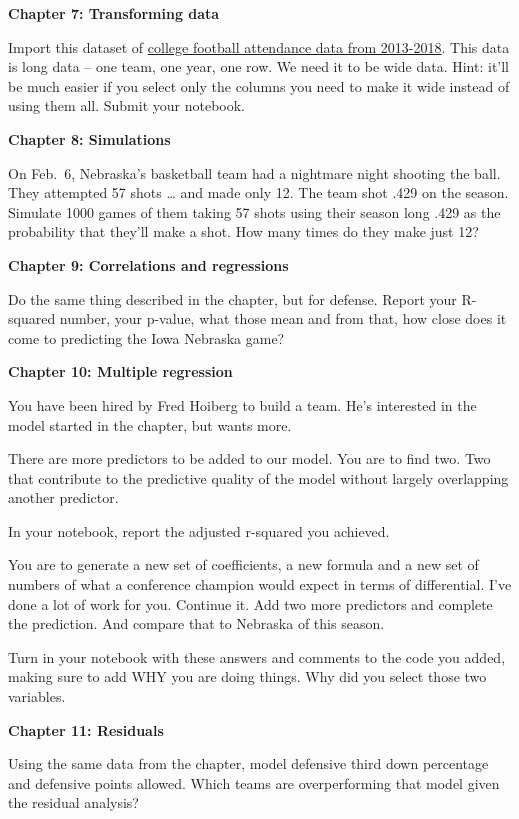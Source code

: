 \documentclass[
]{book}
\begin{document}
\textbf{Chapter 7: Transforming data}

Import this dataset of \href{https://unl.box.com/s/fs3rj0dns1xh2y1dx0c2yc0adh4u3zsy}{college football attendance data from 2013-2018}. This data is long data -- one team, one year, one row. We need it to be wide data. Hint: it'll be much easier if you select only the columns you need to make it wide instead of using them all. Submit your notebook.

\textbf{Chapter 8: Simulations}

On Feb.~6, Nebraska's basketball team had a nightmare night shooting the ball. They attempted 57 shots \ldots{} and made only 12. The team shot .429 on the season. Simulate 1000 games of them taking 57 shots using their season long .429 as the probability that they'll make a shot. How many times do they make just 12?

\textbf{Chapter 9: Correlations and regressions}

Do the same thing described in the chapter, but for defense. Report your R-squared number, your p-value, what those mean and from that, how close does it come to predicting the Iowa Nebraska game?

\textbf{Chapter 10: Multiple regression}

You have been hired by Fred Hoiberg to build a team. He's interested in the model started in the chapter, but wants more.

There are more predictors to be added to our model. You are to find two. Two that contribute to the predictive quality of the model without largely overlapping another predictor.

In your notebook, report the adjusted r-squared you achieved.

You are to generate a new set of coefficients, a new formula and a new set of numbers of what a conference champion would expect in terms of differential. I've done a lot of work for you. Continue it. Add two more predictors and complete the prediction. And compare that to Nebraska of this season.

Turn in your notebook with these answers and comments to the code you added, making sure to add WHY you are doing things. Why did you select those two variables.

\textbf{Chapter 11: Residuals}

Using the same data from the chapter, model defensive third down percentage and defensive points allowed. Which teams are overperforming that model given the residual analysis?
\end{document}
